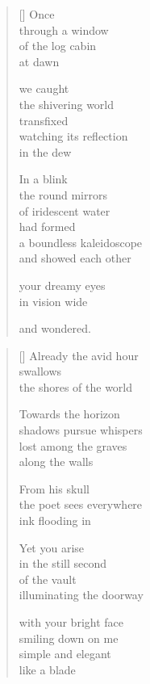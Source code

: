 \documentclass[14pt]{extbook}
\newcommand*{\centeredornament}{\centerline{\pgfornament[width=6cm]{88}}}
\begin{document}
\newpage

\vspace*{-15mm}
\centeredornament
\vspace*{-7mm}


\settowidth{\versewidth}{a boundless kaleidoscope}

\begin{verse}[\versewidth]
  Once \\
  through a window \\
  of the log cabin \\
  at dawn

  we caught \\
  the shivering world \\
  transfixed \\
  watching its reflection \\
  in the dew

  In a blink \\
  the round mirrors \\
  of iridescent water \\
  had formed \\
  a boundless kaleidoscope \\
  and showed each other

  your dreamy eyes \\
  in vision wide

  and wondered.
\end{verse}


\newpage

\vspace*{-15mm}
\centeredornament
\vspace*{-7mm}


\settowidth{\versewidth}{shadows pursue whispers}

\begin{verse}[\versewidth]
  Already the avid hour \\
  swallows \\
  the shores of the world

  Towards the horizon \\
  shadows pursue whispers \\
  lost among the graves \\
  along the walls

  From his skull \\
  the poet sees everywhere \\
  ink flooding in

  Yet you arise \\
  in the still second \\
  of the vault \\
  illuminating the doorway

  with your bright face \\
  smiling down on me \\
  simple and elegant \\
  like a blade
\end{verse}
\end{document}
